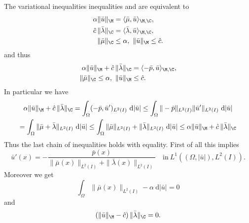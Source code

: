 The variational inequalities inequalities \label{var ineq mu} and \label{var ineq lambda} are equivalent to
\begin{align*}
\alpha\|\bar u\|_{\M}&=\langle \bar\mu,\bar u\rangle_{\M,\C},\\
\hat c\,\|\bar\lambda\|_{\C}&=\langle \bar\lambda,\bar u\rangle_{\M,\C},\\
\|\bar \mu\|_{\C}&\leq\alpha,~\|\bar u\|_{\M}\leq \hat c.
\end{align*}
and thus
\begin{align*}
\alpha\|\bar u\|_{\M}+\hat c\,\|\bar\lambda\|_{\C}&=\langle -\bar p,\bar u\rangle_{\M,\C},\\
\|\bar \mu\|_{\C}\leq\alpha,~\|\bar u\|_{\M}&\leq \hat c.
\end{align*}
In particular we have
\begin{multline*}
\alpha\|\bar u\|_{\M}+\hat c\,\|\bar\lambda\|_{\C}= \int_\Omega(-\bar p,\bar u')_{L^2(I)}~\mathrm d|\bar u|
\leq \int_\Omega\|-\bar p\|_{L^2(I)}\|\bar u'\|_{L^2(I)}~\mathrm d|\bar u|\\
= \int_\Omega\|\bar\mu+\bar\lambda\|_{L^2(I)}~\mathrm d|\bar u|
\leq\int_\Omega\|\bar\mu\|_{L^2(I)}+\|\bar\lambda\|_{L^2(I)}~\mathrm d|\bar u|
\leq\alpha\|\bar u\|_{\M}+\hat c\,\|\bar\lambda\|_{\C}
\end{multline*}
Thus the last chain of inequalities holds with equality. First of all this implies
\[
\bar u'(x)=-\frac{\bar p(x)}{\|\bar \mu(x)\|_{L^2(I)}+\|\bar\lambda(x)\|_{L^2(I)}}\quad\text{in}~L^1((\Omega,|\bar u|),L^2(I)).
\]
Moreover we get
\[
\int_\Omega\|\bar \mu(x)\|_{L^2(I)}-\alpha~\mathrm d|\bar u|=0
\]
and
\[
\left(\|\bar u\|_{\M}-\hat c\right)\|\bar\lambda\|_{\C}=0.
\]




